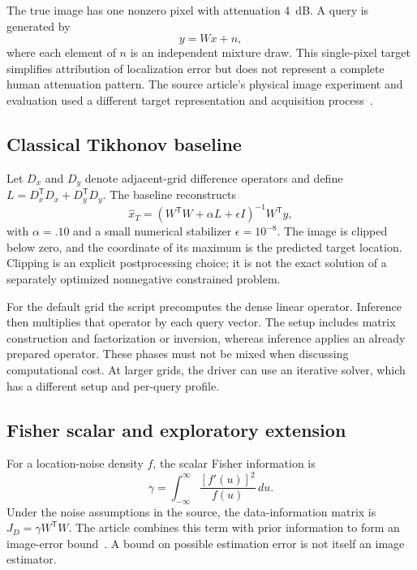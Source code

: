 \documentclass[conference,letterpaper]{IEEEtran}
\newcommand{\T}{^{\mathsf T}}
\begin{document}
The true image has one nonzero pixel with attenuation 4~dB. A query is generated by
\begin{equation}
y=Wx+n,
\label{eq:forward}
\end{equation}
where each element of $n$ is an independent mixture draw. This single-pixel target simplifies attribution of localization error but does not represent a complete human attenuation pattern. The source article's physical image experiment and evaluation used a different target representation and acquisition process~\cite{wilson2010}.

\subsection{Classical Tikhonov baseline}
Let $D_x$ and $D_y$ denote adjacent-grid difference operators and define $L=D_x\T D_x+D_y\T D_y$. The baseline reconstructs
\begin{equation}
\widehat x_T=(W\T W+\alpha L+\epsilon I)^{-1}W\T y,
\label{eq:tikhonov}
\end{equation}
with $\alpha=.10$ and a small numerical stabilizer $\epsilon=10^{-8}$. The image is clipped below zero, and the coordinate of its maximum is the predicted target location. Clipping is an explicit postprocessing choice; it is not the exact solution of a separately optimized nonnegative constrained problem.

For the default grid the script precomputes the dense linear operator. Inference then multiplies that operator by each query vector. The setup includes matrix construction and factorization or inversion, whereas inference applies an already prepared operator. These phases must not be mixed when discussing computational cost. At larger grids, the driver can use an iterative solver, which has a different setup and per-query profile.

\subsection{Fisher scalar and exploratory extension}
For a location-noise density $f$, the scalar Fisher information is
\begin{equation}
\gamma=\int_{-\infty}^{\infty}\frac{[f'(u)]^2}{f(u)}\,du.
\label{eq:gamma}
\end{equation}
Under the noise assumptions in the source, the data-information matrix is $J_D=\gamma W\T W$. The article combines this term with prior information to form an image-error bound~\cite{wilson2010}. A bound on possible estimation error is not itself an image estimator.
\end{document}
